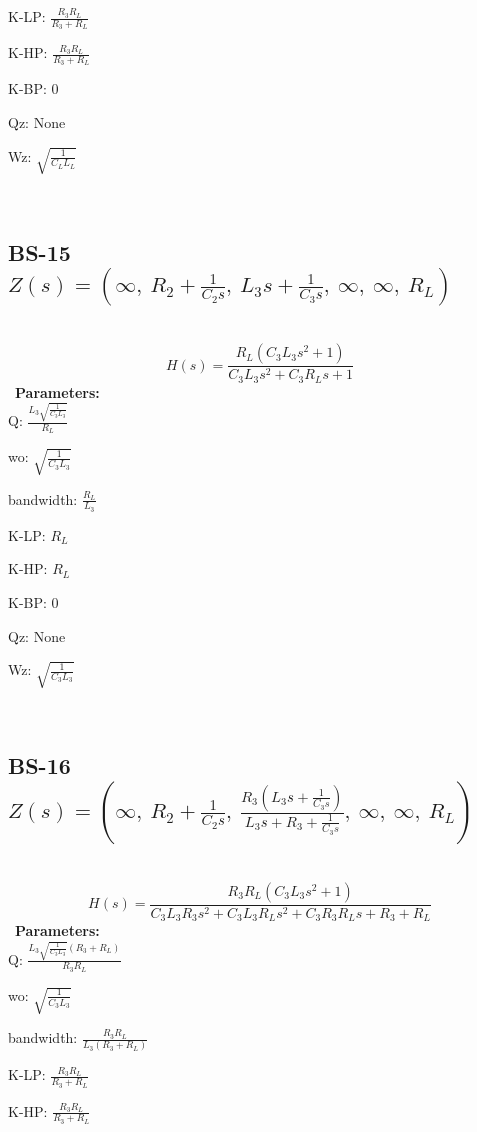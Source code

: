 \documentclass{article}
\begin{document}
K-LP: $\frac{R_{3} R_{L}}{R_{3} + R_{L}}$\ 

K-HP: $\frac{R_{3} R_{L}}{R_{3} + R_{L}}$\ 

K-BP: $0$\ 

Qz: $\text{None}$\ 

Wz: $\sqrt{\frac{1}{C_{L} L_{L}}}$\ 

\ 

\subsection{BS-15 $Z(s) = \left( \infty, \  R_{2} + \frac{1}{C_{2} s}, \  L_{3} s + \frac{1}{C_{3} s}, \  \infty, \  \infty, \  R_{L}\right)$ } \ 
\textbf{\[H(s) = \frac{R_{L} \left(C_{3} L_{3} s^{2} + 1\right)}{C_{3} L_{3} s^{2} + C_{3} R_{L} s + 1}\] } \ 
\textbf{Parameters:}\\ 

Q: $\frac{L_{3} \sqrt{\frac{1}{C_{3} L_{3}}}}{R_{L}}$\ 

wo: $\sqrt{\frac{1}{C_{3} L_{3}}}$\ 

bandwidth: $\frac{R_{L}}{L_{3}}$\ 

K-LP: $R_{L}$\ 

K-HP: $R_{L}$\ 

K-BP: $0$\ 

Qz: $\text{None}$\ 

Wz: $\sqrt{\frac{1}{C_{3} L_{3}}}$\ 

\ 

\subsection{BS-16 $Z(s) = \left( \infty, \  R_{2} + \frac{1}{C_{2} s}, \  \frac{R_{3} \left(L_{3} s + \frac{1}{C_{3} s}\right)}{L_{3} s + R_{3} + \frac{1}{C_{3} s}}, \  \infty, \  \infty, \  R_{L}\right)$ } \ 
\textbf{\[H(s) = \frac{R_{3} R_{L} \left(C_{3} L_{3} s^{2} + 1\right)}{C_{3} L_{3} R_{3} s^{2} + C_{3} L_{3} R_{L} s^{2} + C_{3} R_{3} R_{L} s + R_{3} + R_{L}}\] } \ 
\textbf{Parameters:}\\ 

Q: $\frac{L_{3} \sqrt{\frac{1}{C_{3} L_{3}}} \left(R_{3} + R_{L}\right)}{R_{3} R_{L}}$\ 

wo: $\sqrt{\frac{1}{C_{3} L_{3}}}$\ 

bandwidth: $\frac{R_{3} R_{L}}{L_{3} \left(R_{3} + R_{L}\right)}$\ 

K-LP: $\frac{R_{3} R_{L}}{R_{3} + R_{L}}$\ 

K-HP: $\frac{R_{3} R_{L}}{R_{3} + R_{L}}$\ 
\end{document}
